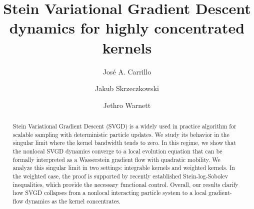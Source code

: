 \documentclass[reqno, 11pt]{amsart}
\title[SVGD dynamics For highly concentrated kernels]{Stein Variational Gradient Descent dynamics for highly concentrated kernels}
\author{José A. Carrillo}
\author{Jakub Skrzeczkowski}
\author{Jethro Warnett}
\numberwithin{equation}{section}
\theoremstyle{definition}
\begin{document}
    
    
    
    \maketitle
    
    \begin{abstract}
        Stein Variational Gradient Descent (SVGD) is a widely used in practice algorithm for scalable sampling with deterministic particle updates. We study its behavior in the singular limit where the kernel bandwidth tends to zero. In this regime, we show that the nonlocal SVGD dynamics converge to a local evolution equation that can be formally interpreted as a Wasserstein gradient flow with quadratic mobility. We analyze this singular limit in two settings: integrable kernels and weighted kernels. In the weighted case, the proof is supported by recently established Stein-log-Sobolev inequalities, which provide the necessary functional control. Overall, our results clarify how SVGD collapses from a nonlocal interacting particle system to a local gradient-flow dynamics as the kernel concentrates.
    \end{abstract}
    
    \setcounter{tocdepth}{1}

    
\end{document}
